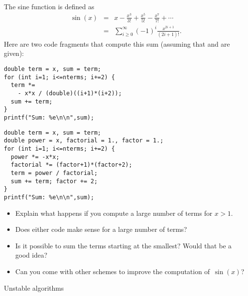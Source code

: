 
\begin{exercise}
  \label{ex:sine-power}
  The sine function is defined as
  \begin{equation}
  \begin{array}{rcl}
    \sin(x) &=& x-\frac{x^3}{3!} + \frac{x^5}{5!} - \frac{x^7}{7!} + \cdots\\
    &=& \sum_{i\geq 0}^\infty (-1)^{i}\frac{x^{2i+1}}{(2i+1)!}.
  \end{array}
  \end{equation}
  Here are two code fragments that compute this sum (assuming that 
  and  are given):
  \begin{multicols}{2}
\unitindent=0pt \scriptsize %
\begin{verbatim}
double term = x, sum = term;
for (int i=1; i<=nterms; i+=2) {
  term *= 
    - x*x / (double)((i+1)*(i+2));
  sum += term;
}
printf("Sum: %e\n\n",sum);
\end{verbatim}
\columnbreak
\begin{verbatim}
double term = x, sum = term;
double power = x, factorial = 1., factor = 1.;
for (int i=1; i<=nterms; i+=2) {
  power *= -x*x;
  factorial *= (factor+1)*(factor+2);
  term = power / factorial;
  sum += term; factor += 2;
}
printf("Sum: %e\n\n",sum);
\end{verbatim}
  \end{multicols}
  \begin{itemize}
  \item
    Explain what happens if you compute a large number of terms for
    $x>1$.
  \item Does either code make sense for a large number of terms?
  \item Is it possible to sum the terms starting at the smallest?
    Would that be a good idea?
  \item Can you come with other schemes to improve the computation
    of~$\sin(x)$?
  \end{itemize}
\end{exercise}

 {Unstable algorithms}

